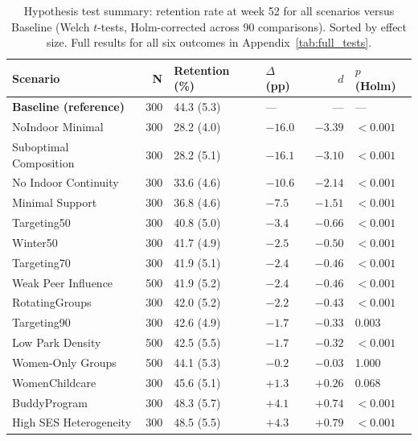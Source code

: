 \begin{table}[H]
\centering
\caption{Hypothesis test summary: retention rate at week 52 for all scenarios
  versus Baseline (Welch $t$-tests, Holm-corrected across 90 comparisons).
  Sorted by effect size. Full results for all six outcomes in Appendix~\ref{tab:full_tests}.}
\label{tab:summary_tests}
\small
\begin{tabular}{lrllrl}
\toprule
\textbf{Scenario} & \textbf{N} & \textbf{Retention (\%)} & \textbf{$\Delta$ (pp)} & \textbf{$d$} & \textbf{$p$ (Holm)} \\
\midrule
  \textbf{Baseline (reference)} & 300 & 44.3 (5.3) & --- & --- & --- \\
  NoIndoor Minimal & 300 & 28.2 (4.0) & $-16.0$ & $-3.39$ & $<0.001$\rlap{$^{***}$} \\
  Suboptimal Composition & 300 & 28.2 (5.1) & $-16.1$ & $-3.10$ & $<0.001$\rlap{$^{***}$} \\
  No Indoor Continuity & 300 & 33.6 (4.6) & $-10.6$ & $-2.14$ & $<0.001$\rlap{$^{***}$} \\
  Minimal Support & 300 & 36.8 (4.6) & $-7.5$ & $-1.51$ & $<0.001$\rlap{$^{***}$} \\
  Targeting50 & 300 & 40.8 (5.0) & $-3.4$ & $-0.66$ & $<0.001$\rlap{$^{***}$} \\
  Winter50 & 300 & 41.7 (4.9) & $-2.5$ & $-0.50$ & $<0.001$\rlap{$^{***}$} \\
  Targeting70 & 300 & 41.9 (5.1) & $-2.4$ & $-0.46$ & $<0.001$\rlap{$^{***}$} \\
  Weak Peer Influence & 500 & 41.9 (5.2) & $-2.4$ & $-0.46$ & $<0.001$\rlap{$^{***}$} \\
  RotatingGroups & 300 & 42.0 (5.2) & $-2.2$ & $-0.43$ & $<0.001$\rlap{$^{***}$} \\
  Targeting90 & 300 & 42.6 (4.9) & $-1.7$ & $-0.33$ & 0.003\rlap{$^{**}$} \\
  Low Park Density & 500 & 42.5 (5.5) & $-1.7$ & $-0.32$ & $<0.001$\rlap{$^{***}$} \\
  Women-Only Groups & 500 & 44.1 (5.3) & $-0.2$ & $-0.03$ & 1.000 \\
  WomenChildcare & 300 & 45.6 (5.1) & $+1.3$ & $+0.26$ & 0.068 \\
  BuddyProgram & 300 & 48.3 (5.7) & $+4.1$ & $+0.74$ & $<0.001$\rlap{$^{***}$} \\
  High SES Heterogeneity & 300 & 48.5 (5.5) & $+4.3$ & $+0.79$ & $<0.001$\rlap{$^{***}$} \\
\bottomrule
\end{tabular}
\end{table}

